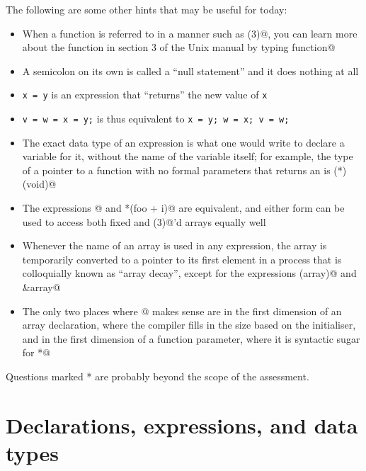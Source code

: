 \documentclass[a4paper,12pt]{article}
\begin{document}
\newpage

The following are some other hints that may be useful for today:

\begin{itemize}
	\item When a function is referred to in a manner such as
	      \lstinline@function(3)@, you can learn more about the
	      function in section 3 of the Unix manual by typing
	       function@
	\item A semicolon on its own is called a ``null statement'' and
	      it does nothing at all
	\item \texttt{x = y} is an expression that ``returns''
	      the new value of \texttt{x}
	\item \texttt{v = w = x = y;} is thus equivalent to
	      \texttt{x = y; w = x; v = w;}
	\item The exact data type of an expression is what one would
	      write to declare a variable for it, without the name of
	      the variable itself; for example, the type of a pointer
	      to a function with no formal parameters that returns an
	      \lstinline@int@ is \lstinline@int (*)(void)@
	\item The expressions \lstinline@foo[i]@ and
	      \lstinline@*(foo + i)@ are equivalent, and either form
	      can be used to access both fixed and
	      \lstinline@malloc(3)@'d arrays equally well
	\item Whenever the name of an array is used in any expression,
	      the array is temporarily converted to a pointer to its
	      first element in a process that is colloquially known as
	      ``array decay'', except for the expressions
	      \lstinline@sizeof(array)@ and \lstinline@&array@
	\item The only two places where \lstinline@[]@ makes sense are
	      in the first dimension of an array declaration, where the
	      compiler fills in the size based on the initialiser, and
	      in the first dimension of a function parameter, where it
	      is syntactic sugar for \lstinline@*@
\end{itemize}

Questions marked * are probably beyond the scope of the assessment.

\newpage

\section{Declarations, expressions, and data types}
\end{document}
